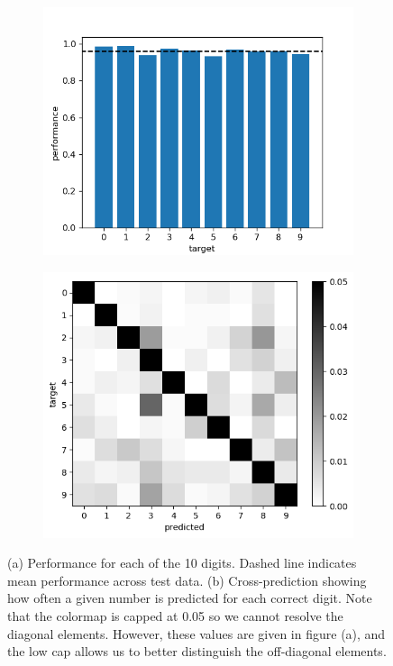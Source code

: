 \documentclass{article}
\begin{document}
\begin{figure}[h]
	\centering
	\begin{subfigure}[t]{0.48\linewidth}
		\centering
		\includegraphics[width = 1.0\linewidth, trim={0 0 0 0}, clip=true]{figures/predictionhist.png}
		\subcaption{}
		\label{fig:predictionhist}	
	\end{subfigure}%
	\hspace{0.02 \linewidth}
	\begin{subfigure}[t]{0.42\linewidth}
		\centering
		\includegraphics[width = 1.0\linewidth, trim={0 0 0 0}, clip=true]{figures/predictions.png}
		\subcaption{}
		\label{fig:predictions}	
	\end{subfigure}%
\caption{(a) Performance for each of the 10 digits. Dashed line indicates mean performance across test data. (b) Cross-prediction showing how often a given number is predicted for each correct digit. Note that the colormap is capped at 0.05 so we cannot resolve the diagonal elements. However, these values are given in figure (a), and the low cap allows us to better distinguish the off-diagonal elements. }
\label{fig:prediction_errors}
\end{figure}
\end{document}
